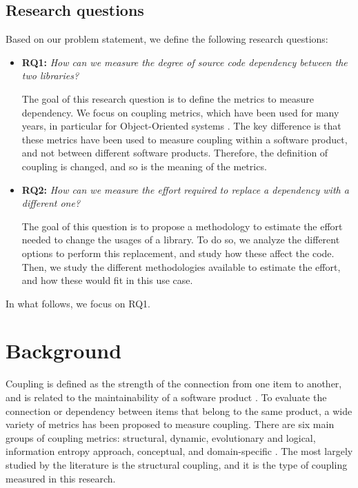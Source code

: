 \documentclass[a4paper]{article}
\begin{document}
\subsection{Research questions}
Based on our problem statement, we define the following research questions:

\begin{itemize}
  \item \textbf{RQ1:} \textit{How can we measure the degree of source code dependency between the two libraries?}

  The goal of this research question is to define the metrics to measure dependency. We focus on coupling metrics, which have been used for many years, in particular for Object-Oriented systems \cite{briand1999unified}. The key difference is that these metrics have been used to measure coupling within a software product, and not between different software products. Therefore, the definition of coupling is changed, and so is the meaning of the metrics.

  \item \textbf{RQ2:} \textit{How can we measure the effort required to replace a dependency with a different one?}

  The goal of this question is to propose a methodology to estimate the effort needed to change the usages of a library. To do so, we analyze the different options to perform this replacement, and study how these affect the code. Then, we study the different methodologies available to estimate the effort, and how these would fit in this use case.
\end{itemize}

In what follows, we focus on RQ1.

\section{Background}\label{section:Background}
Coupling is defined  as the strength of the connection from one item to another, and is related to the maintainability of a software product \cite{gupta2009package}. To evaluate the connection or dependency between items that belong to the same product, a wide variety of metrics has been proposed to measure coupling.
There are six main groups of coupling metrics: structural, dynamic, evolutionary and logical, information entropy approach, conceptual, and domain-specific  \cite{poshyvanyk2006conceptual}. The most largely studied by the literature is the structural coupling, and it is the type of coupling measured in this research.
\end{document}
